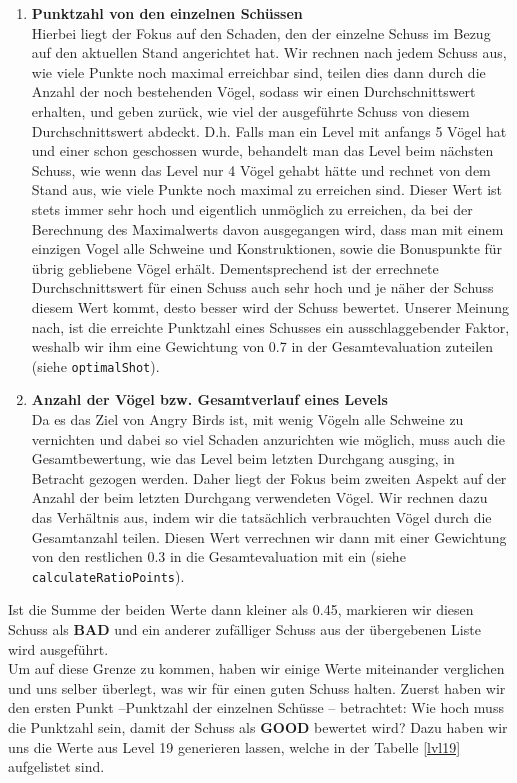 \begin{table}[H]
\begin{enumerate}
\item \textbf{Punktzahl von den einzelnen Schüssen} \\
Hierbei liegt der Fokus auf den Schaden, den der einzelne Schuss im Bezug auf den aktuellen Stand angerichtet hat. Wir rechnen nach jedem Schuss aus, wie viele Punkte noch maximal erreichbar sind, teilen dies dann durch die Anzahl der noch bestehenden Vögel, sodass wir einen Durchschnittswert erhalten, und geben zurück, wie viel der ausgeführte Schuss von diesem Durchschnittswert abdeckt. D.h. Falls man ein Level mit anfangs 5 Vögel hat und einer schon geschossen wurde, behandelt man das Level beim nächsten Schuss, wie wenn das Level nur 4 Vögel gehabt hätte und rechnet von dem Stand aus, wie viele Punkte noch maximal zu erreichen sind. Dieser Wert ist stets immer sehr hoch und eigentlich unmöglich zu erreichen, da bei der Berechnung des Maximalwerts davon ausgegangen wird, dass man mit einem einzigen Vogel alle Schweine und Konstruktionen, sowie die Bonuspunkte für übrig gebliebene Vögel erhält. Dementsprechend ist der errechnete Durchschnittswert für einen Schuss auch sehr hoch und je näher der Schuss diesem Wert kommt, desto besser wird der Schuss bewertet. Unserer Meinung nach, ist die erreichte Punktzahl eines Schusses ein ausschlaggebender Faktor, weshalb wir ihm eine Gewichtung von 0.7 in der Gesamtevaluation zuteilen (siehe \texttt{optimalShot}). \\
\item \textbf{Anzahl der Vögel bzw. Gesamtverlauf eines Levels} \\
Da es das Ziel von Angry Birds ist, mit wenig Vögeln alle Schweine zu vernichten und dabei so viel Schaden anzurichten wie möglich, muss auch die Gesamtbewertung, wie das Level beim letzten Durchgang ausging, in Betracht gezogen werden. Daher liegt der Fokus beim zweiten Aspekt auf der Anzahl der beim letzten Durchgang verwendeten Vögel. Wir rechnen dazu das Verhältnis aus, indem wir die tatsächlich verbrauchten Vögel durch die Gesamtanzahl teilen. Diesen Wert verrechnen wir dann mit einer Gewichtung von den restlichen 0.3 in die Gesamtevaluation mit ein (siehe \texttt{calculateRatioPoints}).
\end{enumerate}
\end{table}

Ist die Summe der beiden Werte dann kleiner als 0.45, markieren wir diesen Schuss als \textbf{BAD} und ein anderer zufälliger Schuss aus der übergebenen Liste wird ausgeführt.\\
Um auf diese Grenze zu kommen, haben wir einige Werte miteinander verglichen und uns selber überlegt, was wir für einen guten Schuss halten. Zuerst haben wir den ersten Punkt --Punktzahl der einzelnen Schüsse -- betrachtet: Wie hoch muss die Punktzahl sein, damit der Schuss als \textbf{GOOD} bewertet wird? Dazu haben wir uns die Werte aus Level 19 generieren lassen, welche in der Tabelle \ref{lvl19} aufgelistet sind.


